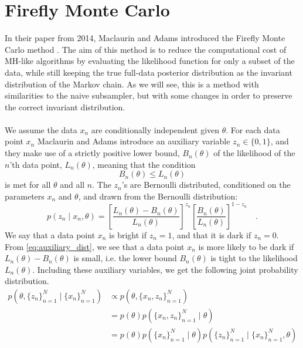  \section{Firefly Monte Carlo}\label{sec:Firefly}
In their paper from 2014, Maclaurin and Adams  introduced the Firefly Monte Carlo method \cite{Maclaurin:1}. 
The aim of this method is to reduce the computational cost of MH-like algorithms by evaluating the likelihood function for only a subset of the data, while still keeping the true full-data posterior distribution as the invariant distribution of the Markov chain. As we will see, this is a method with similarities to the naive subsampler, but with some changes in order to preserve the correct invariant distribution.  \\ \\
We assume the data $x_n$ are conditionally independent given $\theta$.
For each data point $x_n$ Maclaurin and Adams introduce an auxiliary variable $z_n \in \{0, 1\}$, and they make use of a strictly positive lower bound, $B_n\left(\theta\right)$ of the likelihood of the $n$'th data point, $L_n\left(\theta\right)$, meaning that the condition 
\begin{equation}
    B_n\left(\theta\right) \leq L_n\left(\theta\right)
\end{equation} is met for all $\theta$ and all $n$. 
The $z_n$'s are  Bernoulli distributed, conditioned on the parameters $x_n$ and $\theta$, 
and drawn from the  Bernoulli distribution:
\begin{equation}\label{eq:auxiliary_dist}
    p(z_n\mid x_n,\theta) = \left[\frac{L_n(\theta) - B_n(\theta)}{L_n(\theta)}\right]^{z_n}\left[\frac{B_n(\theta)}{L_n(\theta)}\right]^{1-z_n} \quad .
\end{equation}
We say that a data point $x_n$ is bright if $z_n = 1$, and that it is dark if $z_n = 0$. 
From \eqref{eq:auxiliary_dist}, we see that a data point $x_n$ is more likely to be dark if $L_n(\theta) - B_n(\theta)$ is small, i.e. the lower bound $B_n(\theta)$ is tight to the likelihood $L_n(\theta)$. Including these auxiliary variables, we get the following joint probability distribution. 
\begin{equation*}
\begin{split}
     p(\theta, \{z_n\}_{n=1}^N\mid\{x_n\}_{n=1}^N) &\propto p(\theta, \{x_n, z_n\}_{n = 1}^N) \\
     &= p(\theta) p(\{x_n, z_n\}_{n=1}^N\mid\theta) \\
     & = p(\theta)p(\{x_n\}_{n=1}^N\mid\theta)p(\{z_n\}_{n=1}^N\mid \{x_n\}_{n=1}^N, \theta)
\end{split}
\end{equation*}{}
